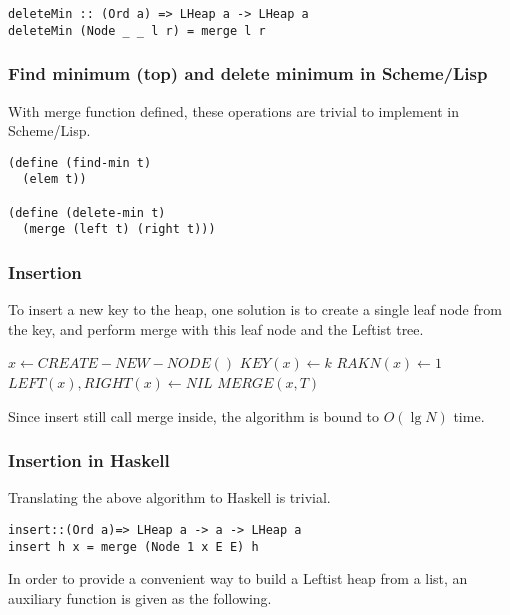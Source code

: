 \documentclass{article}
\begin{document}
\begin{lstlisting}
deleteMin :: (Ord a) => LHeap a -> LHeap a
deleteMin (Node _ _ l r) = merge l r
\end{lstlisting}

\subsubsection*{Find minimum (top) and delete minimum in Scheme/Lisp}

With merge function defined, these operations are trivial to implement
in Scheme/Lisp.

\lstset{language=lisp}
\begin{lstlisting}
(define (find-min t)
  (elem t))

(define (delete-min t)
  (merge (left t) (right t)))
\end{lstlisting}

\subsubsection{Insertion}

To insert a new key to the heap, one solution is to create a single
leaf node from the key, and perform merge with this leaf node and
the Leftist tree.

\begin{algorithmic}[1]
  \State $x \gets CREATE-NEW-NODE()$
  \State $KEY(x) \gets k$
  \State $RAKN(x) \gets 1$
  \State $LEFT(x), RIGHT(x) \gets NIL$
  \State \Return $MERGE(x, T)$
\EndFunction
\end{algorithmic}

Since insert still call merge inside, the algorithm is bound to $O(\lg N)$
time.

\subsubsection*{Insertion in Haskell}

Translating the above algorithm to Haskell is trivial.

\lstset{language=Haskell}
\begin{lstlisting}
insert::(Ord a)=> LHeap a -> a -> LHeap a
insert h x = merge (Node 1 x E E) h
\end{lstlisting}

In order to provide a convenient way to build a Leftist heap from
a list, an auxiliary function is given as the following.
\end{document}
